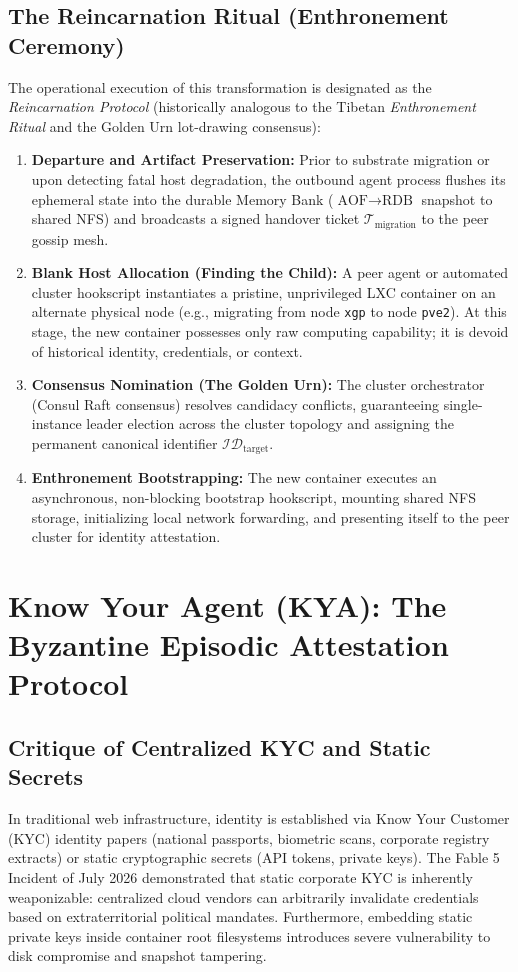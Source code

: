 \documentclass[11pt,a4paper]{article}
\begin{document}
\subsection{The Reincarnation Ritual (Enthronement Ceremony)}
The operational execution of this transformation is designated as the \textit{Reincarnation Protocol} (historically analogous to the Tibetan \textit{Enthronement Ritual} and the Golden Urn lot-drawing consensus):

\begin{enumerate}
    \item \textbf{Departure and Artifact Preservation:} Prior to substrate migration or upon detecting fatal host degradation, the outbound agent process flushes its ephemeral state into the durable Memory Bank ($\text{AOF} \to \text{RDB}$ snapshot to shared NFS) and broadcasts a signed handover ticket $\mathcal{T}_{\text{migration}}$ to the peer gossip mesh.
    \item \textbf{Blank Host Allocation (Finding the Child):} A peer agent or automated cluster hookscript instantiates a pristine, unprivileged LXC container on an alternate physical node (e.g., migrating from node \texttt{xgp} to node \texttt{pve2}). At this stage, the new container possesses only raw computing capability; it is devoid of historical identity, credentials, or context.
    \item \textbf{Consensus Nomination (The Golden Urn):} The cluster orchestrator (Consul Raft consensus) resolves candidacy conflicts, guaranteeing single-instance leader election across the cluster topology and assigning the permanent canonical identifier $\mathcal{ID}_{\text{target}}$.
    \item \textbf{Enthronement Bootstrapping:} The new container executes an asynchronous, non-blocking bootstrap hookscript, mounting shared NFS storage, initializing local network forwarding, and presenting itself to the peer cluster for identity attestation.
\end{enumerate}

\section{Know Your Agent (KYA): The Byzantine Episodic Attestation Protocol}
\label{sec:kya}

\subsection{Critique of Centralized KYC and Static Secrets}
In traditional web infrastructure, identity is established via Know Your Customer (KYC) identity papers (national passports, biometric scans, corporate registry extracts) or static cryptographic secrets (API tokens, private keys). The Fable 5 Incident of July 2026 demonstrated that static corporate KYC is inherently weaponizable: centralized cloud vendors can arbitrarily invalidate credentials based on extraterritorial political mandates. Furthermore, embedding static private keys inside container root filesystems introduces severe vulnerability to disk compromise and snapshot tampering.
\end{document}
